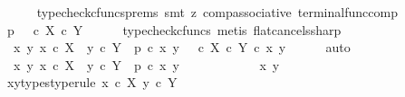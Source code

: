 \begin{isabellebody}
\ \ \ \ \isamarkupfalse%
\ {\isacharparenleft}{\kern0pt}typecheck{\isacharunderscore}{\kern0pt}cfuncs{\isacharunderscore}{\kern0pt}prems{\isacharcomma}{\kern0pt}\ smt\ {\isacharparenleft}{\kern0pt}z{}{\isacharparenright}{\kern0pt}\ comp{\isacharunderscore}{\kern0pt}associative{}\ terminal{\isacharunderscore}{\kern0pt}func{\isacharunderscore}{\kern0pt}comp{\isacharparenright}{\kern0pt}\isanewline
\ \ \isamarkupfalse%
\ \isamarkupfalse%
\ {\isachardoublequoteopen}p\ {\isacharequal}{\kern0pt}\ {\isasymt}\ {\isasymcirc}\isactrlsub c\ {\isasymbeta}\isactrlbsub X\ {\isasymtimes}\isactrlsub c\ Y\isactrlesub {\isachardoublequoteclose}\isanewline
\ \ \ \ \isamarkupfalse%
\ {\isacharparenleft}{\kern0pt}typecheck{\isacharunderscore}{\kern0pt}cfuncs{\isacharcomma}{\kern0pt}\ metis\ flat{\isacharunderscore}{\kern0pt}cancels{\isacharunderscore}{\kern0pt}sharp{\isacharparenright}{\kern0pt}\isanewline
\ \ \isamarkupfalse%
\ \isamarkupfalse%
\ {\isachardoublequoteopen}{\isasymAnd}\ x\ y{\isachardot}{\kern0pt}\ x\ {\isasymin}\isactrlsub c\ X\ {\isasymLongrightarrow}\ y\ {\isasymin}\isactrlsub c\ Y\ {\isasymLongrightarrow}\ p\ {\isasymcirc}\isactrlsub c\ {\isasymlangle}x{\isacharcomma}{\kern0pt}\ y{\isasymrangle}\ {\isacharequal}{\kern0pt}\ {\isacharparenleft}{\kern0pt}{\isasymt}\ {\isasymcirc}\isactrlsub c\ {\isasymbeta}\isactrlbsub X\ {\isasymtimes}\isactrlsub c\ Y\isactrlesub {\isacharparenright}{\kern0pt}\ {\isasymcirc}\isactrlsub c\ {\isasymlangle}x{\isacharcomma}{\kern0pt}\ y{\isasymrangle}{\isachardoublequoteclose}\isanewline
\ \ \ \ \isamarkupfalse%
\ auto\isanewline
\ \ \isamarkupfalse%
\ \isamarkupfalse%
\ {\isachardoublequoteopen}{\isasymAnd}\ x\ y{\isachardot}{\kern0pt}\ x\ {\isasymin}\isactrlsub c\ X\ {\isasymLongrightarrow}\ y\ {\isasymin}\isactrlsub c\ Y\ {\isasymLongrightarrow}\ p\ {\isasymcirc}\isactrlsub c\ {\isasymlangle}x{\isacharcomma}{\kern0pt}\ y{\isasymrangle}\ {\isacharequal}{\kern0pt}\ {\isasymt}{\isachardoublequoteclose}\isanewline
\ \ \isamarkupfalse%
\ {\isacharminus}{\kern0pt}\isanewline
\ \ \ \ \isamarkupfalse%
\ x\ y\isanewline
\ \ \ \ \isamarkupfalse%
\ xy{\isacharunderscore}{\kern0pt}types{\isacharbrackleft}{\kern0pt}type{\isacharunderscore}{\kern0pt}rule{\isacharbrackright}{\kern0pt}{\isacharcolon}{\kern0pt}\ {\isachardoublequoteopen}x\ {\isasymin}\isactrlsub c\ X{\isachardoublequoteclose}\ {\isachardoublequoteopen}y\ {\isasymin}\isactrlsub c\ Y{\isachardoublequoteclose}\isanewline

\end{isabellebody}
